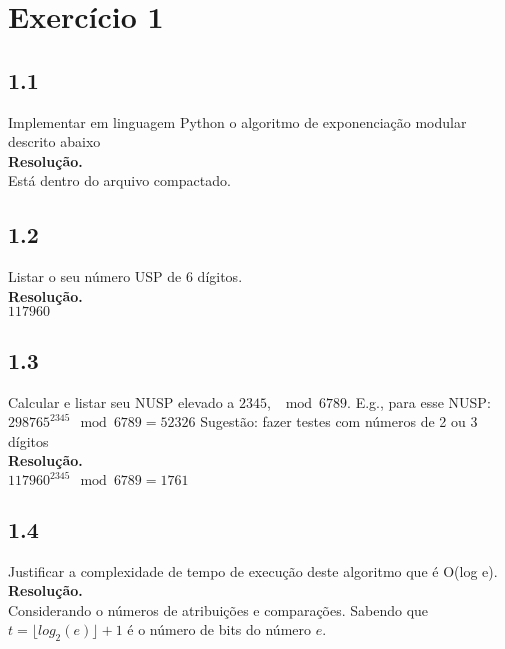 \documentclass[12pt,letterpaper]{article}
\newcommand\answer{\textbf{Resolução.}\xspace}
\begin{document}
\section*{Exercício 1}

\subsection*{1.1}
Implementar em linguagem Python o algoritmo de exponenciação modular descrito abaixo \\

\answer \\
Está dentro do arquivo compactado.

\subsection*{1.2}
Listar o seu número USP de 6 dígitos. \\

\answer \\
$117960$

\subsection*{1.3}
Calcular e listar seu NUSP elevado a $2345$, $\mod 6789$. E.g., para esse NUSP: $298765^{2345} \mod 6789 = 52326$ Sugestão: fazer testes com números de 2 ou 3 dígitos \\

\answer \\
$117960^{2345} \mod 6789 = 1761$

\subsection*{1.4}
Justificar a complexidade de tempo de execução deste algoritmo que é O(log e). \\

\answer \\
Considerando o números de atribuições e comparações.
Sabendo que $t = \lfloor log_2(e) \rfloor + 1$ é o número de bits do número $e$. \\
\end{document}
